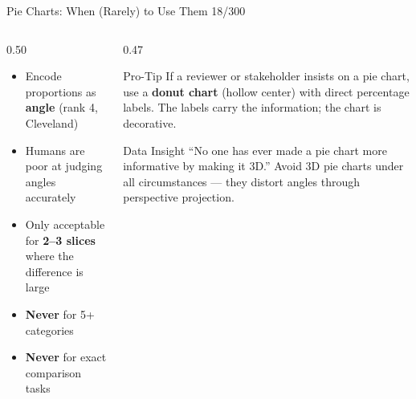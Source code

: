 \documentclass[10pt]{beamer}
\newcommand{\smark}[1]{\hfill{\scriptsize\color{codegray}#1}}
\begin{document}
\begin{frame}{Pie Charts: When (Rarely) to Use Them}
\smark{18/300}
\begin{columns}[T]
\begin{column}{0.50\textwidth}
\begin{itemize}
    \item Encode proportions as \textbf{angle} (rank 4, Cleveland)
    \item Humans are poor at judging angles accurately
    \item Only acceptable for \textbf{2--3 slices} where the difference is large
    \item \textbf{Never} for 5+ categories
    \item \textbf{Never} for exact comparison tasks
\end{itemize}
\end{column}
\begin{column}{0.47\textwidth}
\begin{alertblock}{Pro-Tip}
    \scriptsize If a reviewer or stakeholder insists on a pie chart, use a \textbf{donut chart} (hollow center) with direct percentage labels. The labels carry the information; the chart is decorative.
\end{alertblock}
\vspace{0.1cm}
\begin{exampleblock}{Data Insight}
    \scriptsize ``No one has ever made a pie chart more informative by making it 3D.'' Avoid 3D pie charts under all circumstances --- they distort angles through perspective projection.
\end{exampleblock}
\end{column}
\end{columns}
\end{frame}
\end{document}

